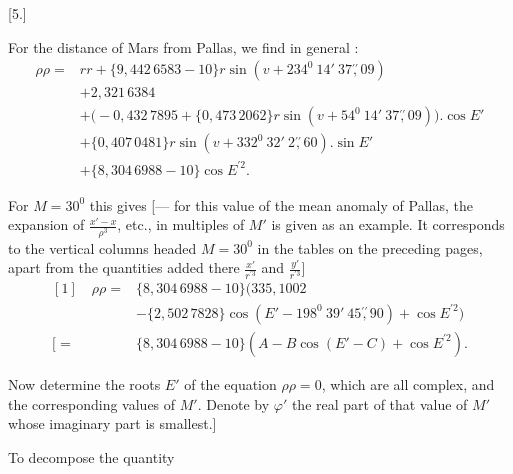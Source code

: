 \clearpage
\begingroup
{}
\renewcommand{\headrulewidth}{0pt}
\par\medskip
{}
\begin{center}[5.]\end{center}
\begingroup
\small
\par\noindent\hspace*{\parindent}For the distance of Mars from Pallas, we find in general%
\HistoricalNoteEight{The numbers in braces \(\{\ \}\) are logarithms.]}:
\[
\begin{aligned}
\rho\rho={}&rr+\{9{,}442\,6583-10\}r\sin(v+234^0\ 14'\ 37\overset{\prime\prime}{,}09)\\
&+2{,}321\,6384\\
&+\bigl(-0{,}432\,7895+\{0{,}473\,2062\}r\sin(v+54^0\ 14'\ 37\overset{\prime\prime}{,}09)\bigr)
  \mathord{.}\cos E'\\
&+\{0{,}407\,0481\}r\sin(v+332^0\ 32'\ 2\overset{\prime\prime}{,}60)
  \mathord{.}\sin E'\\
&+\{8{,}304\,6988-10\}\cos E^{\prime2}.
\end{aligned}
\]
\par\noindent\hspace*{\parindent}For \(M=30^0\) this gives [--- for this value of the mean anomaly of
Pallas, the expansion of \(\frac{x'-x}{\rho^3}\), etc., in multiples of \(M'\) is given as
an example. It corresponds to the vertical columns headed \(M=30^0\)
in the tables on the preceding pages, apart from the quantities added there
\(\frac{x'}{r^{\prime3}}\) and \(\frac{y'}{r^{\prime3}}\)]
\[
\begin{aligned}
{[1]}\quad\rho\rho={}&\{8{,}304\,6988-10\}\bigl(335{,}1002\\
&-\{2{,}502\,7828\}\cos(E'-198^0\ 39'\ 45\overset{\prime\prime}{,}90)+\cos E^{\prime2}\bigr)\\
{[}={}&\{8{,}304\,6988-10\}(A-B\cos(E'-C)+\cos E^{\prime2}).
\end{aligned}
\]
\par\noindent\hspace*{\parindent}Now determine the roots \(E'\) of the equation \(\rho\rho=0\), which are
all complex, and the corresponding values of \(M'\). Denote
by \(\varphi'\) the real part of that value of \(M'\) whose imaginary part is smallest.]
\par\noindent\hspace*{\parindent}To decompose the quantity
